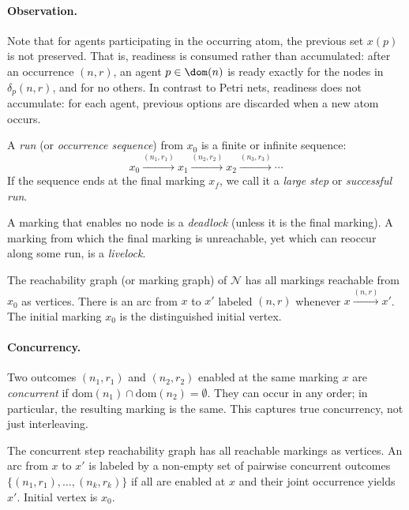 \paragraph{Observation.} Note that for agents participating in the occurring atom, the previous set $x(p)$ is not preserved. That is, readiness is consumed rather than accumulated: after an occurrence $(n,r)$, an agent $p \in \dom(n)$ is ready exactly for the nodes in $\delta_p(n,r)$, and for no others. In contrast to Petri nets, readiness does not accumulate: for each agent, previous options are discarded when a new atom occurs.

A \emph{run} (or \emph{occurrence sequence}) from $x_0$ is a finite or infinite sequence:
\[
x_0 \xrightarrow{(n_1,r_1)} x_1 \xrightarrow{(n_2,r_2)} x_2 \xrightarrow{(n_3,r_3)} \cdots
\]
If the sequence ends at the final marking $x_f$, we call it a \emph{large step} or \emph{successful run}.

A marking that enables no node is a \emph{deadlock} (unless it is the final marking). A marking from which the final marking is unreachable, yet which can reoccur along some run, is a \emph{livelock}.

\begin{definition}
\label{def:reach-graph}
The \textsf{reachability graph} (or \textsf{marking graph}) of $\mathcal{N}$ has all markings reachable from $x_0$ as vertices. There is an arc from $x$ to $x'$ labeled $(n,r)$ whenever $x \xrightarrow{(n,r)} x'$. The initial marking $x_0$ is the distinguished initial vertex.
\end{definition}

\paragraph{Concurrency.} Two outcomes $(n_1,r_1)$ and $(n_2,r_2)$ enabled at the same marking $x$ are \emph{concurrent} if $\text{dom}(n_1) \cap \text{dom}(n_2) = \emptyset$. They can occur in any order; in particular, the resulting marking is the same. This captures true concurrency, not just interleaving.

\begin{definition}
\label{def:concurrent-graph}
The \textsf{concurrent step reachability graph} has all reachable markings as vertices. An arc from $x$ to $x'$ is labeled by a non-empty set of pairwise concurrent outcomes $\{(n_1,r_1), \ldots, (n_k,r_k)\}$ if all are enabled at $x$ and their joint occurrence yields $x'$. Initial vertex is $x_0$.
\end{definition}

